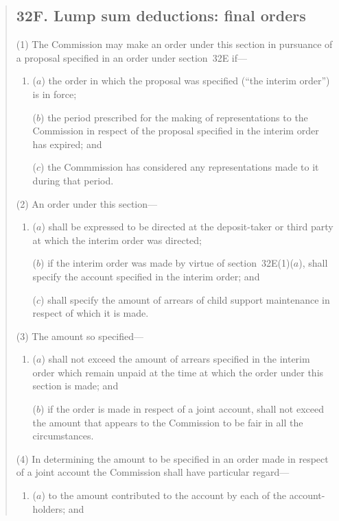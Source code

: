 \documentclass[12pt,a4paper]{article}
\begin{document}
\begin{quotation}
\subsection*{32F. Lump sum deductions: final orders}

(1) The Commission may make an order under this section in pursuance of a proposal specified in an order under section~32E if---
\begin{enumerate}\item[]
($a$)
the order in which the proposal was specified (“the interim order”) is in force;

($b$)
the period prescribed for the making of representations to the Commission in respect of the proposal specified in the interim order has expired; and

($c$)
the Commmission has considered any representations made to it during that period.
\end{enumerate}

(2) An order under this section---
\begin{enumerate}\item[]
($a$)
shall be expressed to be directed at the deposit-taker or third party at which the interim order was directed;

\begin{sloppypar}
($b$)
if the interim order was made by virtue of section~32E(1)($a$), shall specify the account specified in the interim order; and
\end{sloppypar}

($c$)
shall specify the amount of arrears of child support maintenance in respect of which it is made.
\end{enumerate}

(3) The amount so specified---
\begin{enumerate}\item[]
($a$) shall not exceed the amount of arrears specified in the interim order which remain unpaid at the time at which the order under this section is made; and

($b$) if the order is made in respect of a joint account, shall not exceed the amount that appears to the Commission to be fair in all the circumstances.
\end{enumerate}

(4)
In determining the amount to be specified in an order made in respect of a joint account the Commission shall have particular regard---
\begin{enumerate}\item[]
($a$) to the amount contributed to the account by each of the account-holders; and


\end{enumerate}
\end{quotation}
\end{document}
